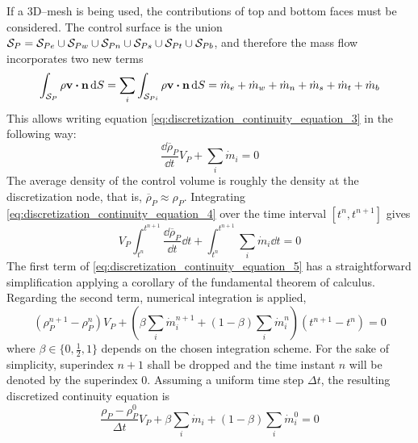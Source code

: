 If a 3D--mesh is being used, the contributions of top and bottom faces must be considered. The control surface is the union $\mathcal{S}_{P} = \mathcal{S}_{Pe} \cup \mathcal{S}_{Pw} \cup \mathcal{S}_{Pn} \cup \mathcal{S}_{Ps} \cup \mathcal{S}_{Pt} \cup \mathcal{S}_{Pb}$, and therefore the mass flow incorporates two new terms
\begin{equation}
	\int_{\cs{P}} \rho \vb{v} \vdot \vb{n} \dd{S} = 
	\sum_{i} \int_{\cs{Pi}} \rho \vb{v} \vdot \vb{n} \dd{S} = 
	\dot{m}_e + \dot{m}_w + \dot{m}_n + \dot{m}_s + \dot{m}_t + \dot{m}_b
\end{equation}
This allows writing equation \eqref{eq:discretization_continuity_equation_3} in the following way:
\begin{equation} \label{eq:discretization_continuity_equation_4}
	\frac{\dd \overline{\rho}_P}{\dd{t}} V_P + \sum_i \dot{m}_i = 0
\end{equation}
The average density of the control volume is roughly the density at the discretization node, that is, $\overline{\rho}_P \approx \rho_P$. Integrating \eqref{eq:discretization_continuity_equation_4} over the time interval $[t^n, t^{n+1}]$ gives
\begin{equation} \label{eq:discretization_continuity_equation_5}
	V_P \int_{t^n}^{t^{n+1}} \frac{\dd \overline{\rho}_P}{\dd{t}} \dd{t} + 
	\int_{t^n}^{t^{n+1}} \sum_i \dot{m}_i \dd{t} = 0
\end{equation}
The first term of \eqref{eq:discretization_continuity_equation_5} has a straightforward simplification applying a corollary of the fundamental theorem of calculus. Regarding the second term, numerical integration is applied,
\begin{equation} \label{eq:discretization_continuity_equation_6}
	(\rho_P^{n+1} - \rho_P^n) V_P + 
	\left( \beta \sum_i \dot{m}_i^{n+1} + (1 - \beta) \sum_i \dot{m}_i^{n} \right) (t^{n+1} - t^n) = 0
\end{equation}
where $\beta \in \{ 0, \frac{1}{2}, 1 \}$ depends on the chosen integration scheme. For the sake of simplicity, superindex $n+1$ shall be dropped and the time instant $n$ will be denoted by the superindex $0$. Assuming a uniform time step $\Delta t$, the resulting discretized continuity equation is
\begin{equation}
	\frac{\rho_P - \rho_P^0}{\Delta t} V_P + \beta \sum_i \dot{m}_i + (1 - \beta) \sum_i \dot{m}_i^0 = 0
\end{equation}





